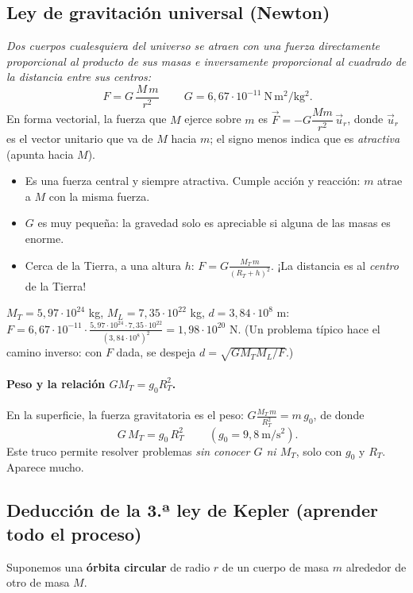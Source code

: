 \documentclass[11pt,a4paper]{article}
\newcommand{\ur}{\vec{u}_r}
\begin{document}
\subsection{Ley de gravitación universal (Newton)}
\emph{Dos cuerpos cualesquiera del universo se atraen con una fuerza directamente proporcional al producto de sus masas e inversamente proporcional al cuadrado de la distancia entre sus centros:}
\[
\boxed{\ F=G\,\frac{M\,m}{r^2}\ }\qquad G=6{,}67\cdot10^{-11}\ \mathrm{N\,m^2/kg^2}.
\]
En forma vectorial, la fuerza que $M$ ejerce sobre $m$ es $\vec F=-G\dfrac{Mm}{r^2}\,\ur$, donde $\ur$ es el vector unitario que va de $M$ hacia $m$; el signo menos indica que es \emph{atractiva} (apunta hacia $M$).
\begin{itemize}[itemsep=2pt]
  \item Es una fuerza central y siempre atractiva. Cumple acción y reacción: $m$ atrae a $M$ con la misma fuerza.
  \item $G$ es muy pequeña: la gravedad solo es apreciable si alguna de las masas es enorme.
  \item Cerca de la Tierra, a una altura $h$: $F=G\frac{M_T\,m}{(R_T+h)^2}$. ¡La distancia es al \emph{centro} de la Tierra!
\end{itemize}

\begin{ejemplo}[title={Ejemplo: fuerza Tierra--Luna}]
$M_T=5{,}97\cdot10^{24}$ kg, $M_L=7{,}35\cdot10^{22}$ kg, $d=3{,}84\cdot10^8$ m:
$F=6{,}67\cdot10^{-11}\cdot\frac{5{,}97\cdot10^{24}\cdot7{,}35\cdot10^{22}}{(3{,}84\cdot10^8)^2}=1{,}98\cdot10^{20}$ N.
(Un problema típico hace el camino inverso: con $F$ dada, se despeja $d=\sqrt{GM_TM_L/F}$.)
\end{ejemplo}

\paragraph{Peso y la relación $G M_T=g_0R_T^2$.} En la superficie, la fuerza gravitatoria es el peso: $G\frac{M_T\,m}{R_T^2}=m\,g_0$, de donde
\[
\boxed{\ G\,M_T=g_0\,R_T^2\ }\qquad(g_0=9{,}8\ \mathrm{m/s^2}).
\]
Este truco permite resolver problemas \emph{sin conocer $G$ ni $M_T$}, solo con $g_0$ y $R_T$. Aparece mucho.

\subsection{Deducción de la 3.ª ley de Kepler (aprender todo el proceso)}
Suponemos una \textbf{órbita circular} de radio $r$ de un cuerpo de masa $m$ alrededor de otro de masa $M$.
\end{document}
